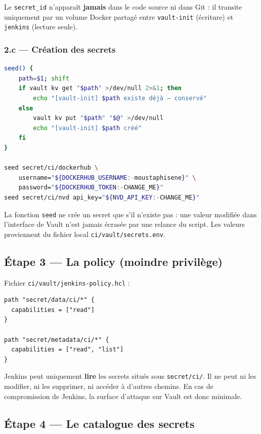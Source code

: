 \documentclass[11pt,a4paper]{article}
\newcommand{\vpath}[1]{\texttt{#1}}
\begin{document}
\begin{retenir}
Le \texttt{secret\_id} n'apparaît \textbf{jamais} dans le code source ni dans Git : il
transite uniquement par un volume Docker partagé entre \texttt{vault-init} (écriture)
et \texttt{jenkins} (lecture seule).
\end{retenir}

\subsubsection*{2.c — Création des secrets}

\begin{lstlisting}[language=bash]
seed() {
    path=$1; shift
    if vault kv get "$path" >/dev/null 2>&1; then
        echo "[vault-init] $path existe déjà — conservé"
    else
        vault kv put "$path" "$@" >/dev/null
        echo "[vault-init] $path créé"
    fi
}

seed secret/ci/dockerhub \
    username="${DOCKERHUB_USERNAME:-moustaphisene}" \
    password="${DOCKERHUB_TOKEN:-CHANGE_ME}"
seed secret/ci/nvd api_key="${NVD_API_KEY:-CHANGE_ME}"
\end{lstlisting}

La fonction \texttt{seed} ne crée un secret que s'il n'existe pas : une valeur modifiée
dans l'interface de Vault n'est jamais écrasée par une relance du script. Les valeurs
proviennent du fichier local \vpath{ci/vault/secrets.env}.

\subsection{Étape 3 — La policy (moindre privilège)}

Fichier \vpath{ci/vault/jenkins-policy.hcl} :

\begin{lstlisting}[language=hcl]
path "secret/data/ci/*" {
  capabilities = ["read"]
}

path "secret/metadata/ci/*" {
  capabilities = ["read", "list"]
}
\end{lstlisting}

Jenkins peut uniquement \textbf{lire} les secrets situés sous \vpath{secret/ci/}. Il ne
peut ni les modifier, ni les supprimer, ni accéder à d'autres chemins. En cas de
compromission de Jenkins, la surface d'attaque sur Vault est donc minimale.

\subsection{Étape 4 — Le catalogue des secrets}
\end{document}
